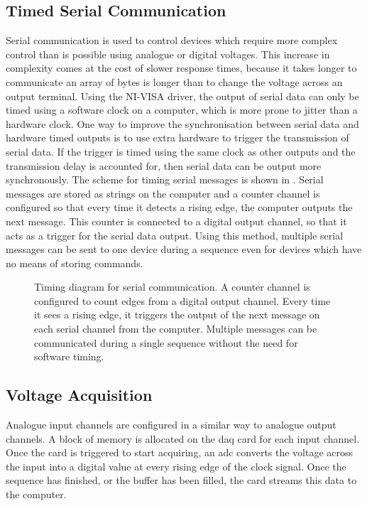 \subsection{Timed Serial Communication}\label{subsec:compinterface_serial}
Serial communication is used to control devices which require more complex control than is possible using analogue or digital voltages. This increase in complexity comes at the cost of slower response times, because it takes longer to communicate an array of bytes is longer than to change the voltage across an output terminal. Using the NI-VISA driver, the output of serial data can only be timed using a software clock on a computer, which is more prone to jitter than a hardware clock. One way to improve the synchronisation between serial data and hardware timed outputs is to use extra hardware to trigger the transmission of serial data. If the trigger is timed using the same clock as other outputs and the transmission delay is accounted for, then serial data can be output more synchronously. The scheme for timing serial messages is shown in . Serial messages are stored as strings on the computer and a counter channel is configured so that every time it detects a rising edge, the computer outputs the next message. This counter is connected to a digital output channel, so that it acts as a trigger for the serial data output. Using this method, multiple serial messages can be sent to one device during a sequence even for devices which have no means of storing commands.
\begin{figure}
    \centering
    
    \caption[Timing diagram for serial communication]{Timing diagram for serial communication. A counter channel is configured to count edges from a digital output channel. Every time it sees a rising edge, it triggers the output of the next message on each serial channel from the computer. Multiple messages can be communicated during a single sequence without the need for software timing.}\label{fig:serial_timing}
\end{figure} 
\subsection{Voltage Acquisition}\label{subsec:compinterface_mmacquisition}
Analogue input channels are configured in a similar way to analogue output channels. A block of memory is allocated on the \ac{daq} card for each input channel. Once the card is triggered to start acquiring, an \ac{adc} converts the voltage across the input into a digital value at every rising edge of the clock signal. Once the sequence has finished, or the buffer has been filled, the card streams this data to the computer.
